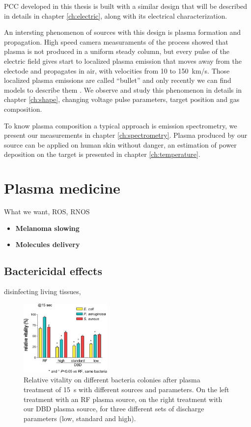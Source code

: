 PCC developed in this thesis is built with a similar design that will be described in details in chapter \ref{ch:electric}, along with its electrical characterization. 

An intersting phenomenon of sources with this design is plasma formation and propagation. High speed camera measuraments of the process showed that plasma is not produced in a uniform steady column, but every pulse of the electric field gives start to localized plasma emission that moves away from the electode and propagates in air, with velocities from \num{10} to \SI{150}{\kilo\meter/\second}. Those localized plasma emissions are called ``bullet'' and only recently we can find models to describe them \cite{Lu2016DynamicsOA}. We observe and study this phenomenon in details in chapter \ref{ch:shape}, changing voltage pulse parameters, target position and gas composition.

To know plasma composition a typical approach is emission spectrometry, we present our measurements in chapter \ref{ch:spectrometry}.
Plasma produced by our source can be applied on human skin without danger, an estimation of power deposition on the target is presented in chapter \ref{ch:temperature}.


\section{Plasma medicine}
What we want, ROS, RNOS

\begin{itemize}
 \item \textbf{Melanoma slowing}
 \item \textbf{Molecules delivery}
\end{itemize}




\subsection{Bactericidal effects}
disinfecting living tissues, 

\begin{figure}
 \centering
 \includegraphics[width=0.4\textwidth]{Images/Intro/bacteria2.png}
 \caption{Relative vitality on different bacteria colonies after plasma treatment of \SI{15}{\second} with different sources and parameters. On the left treatment with an RF plasma source, on the right treatment with our DBD plasma source, for three different sets of discharge parameters (low, standard and high).}
 \label{fig:bact}
\end{figure}

